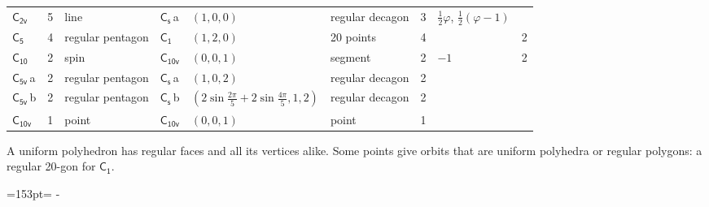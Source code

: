 \documentclass[10pt,a4paper]{article}
\newcommand{\needspace}[1]{\par\penalty-100\begingroup\dimen0=#1\relax\dimen2=\pagegoal
  \advance\dimen2-\pagetotal\ifdim\dimen0>\dimen2\relax\ifdim\dimen2>0pt\vfil\break\fi\fi
  \endgroup}
\numberwithin{equation}{section}
\newcommand{\grp}[1]{\mathsf{#1}}
\newcommand{\clsletter}[1]{\,{\scriptsize\color{black!55}#1}}
\newcommand{\goldenratio}{\varphi}
\newlength{\fillwidth}\newlength{\cellwidth}\newlength{\colwidth}
\begin{document}
{{\begin{longtable}{@{}lrllllr>{\RaggedRight\arraybackslash}p{\fillwidth}r@{}}
\href{C2v.pdf}{$\grp{C_{2v}}$} & 5 & line & \href{C1v.pdf}{$\grp{C_{s}}$}\clsletter{a} & $(1, 0, 0)$ & regular decagon & 3 & ${\tfrac{1}{2}\goldenratio{}}$, ${\tfrac{1}{2}(\goldenratio - 1)}$ & \\
\href{C5.pdf}{$\grp{C_{5}}$} & 4 & regular pentagon & \href{C1.pdf}{$\grp{C_{1}}$} & $(1, 2, 0)$ & 20 points & 4 &  & 2\\
\href{C10.pdf}{$\grp{C_{10}}$} & 2 & spin & \href{C10v.pdf}{$\grp{C_{10v}}$} & $(0, 0, 1)$ & segment & 2 & ${-1}$ & 2\\
\href{C5v.pdf}{$\grp{C_{5v}}$}\clsletter{a} & 2 & regular pentagon & \href{C1v.pdf}{$\grp{C_{s}}$}\clsletter{a} & $(1, 0, 2)$ & regular decagon & 2 &  & \\
\href{C5v.pdf}{$\grp{C_{5v}}$}\clsletter{b} & 2 & regular pentagon & \href{C1v.pdf}{$\grp{C_{s}}$}\clsletter{b} & $(2\sin\tfrac{2\pi}{5} + 2\sin\tfrac{4\pi}{5}, 1, 2)$ & regular decagon & 2 &  & \\*
\href{C10v.pdf}{$\grp{C_{10v}}$} & 1 & point & \href{C10v.pdf}{$\grp{C_{10v}}$} & $(0, 0, 1)$ & point & 1 &  & \\
\bottomrule\end{longtable}}}
A uniform polyhedron has regular faces and all its vertices alike. Some points give orbits that are uniform polyhedra or regular polygons: a regular 20-gon for \href{C1.pdf}{$\grp{C_{1}}$}.
\needspace{153pt}
\end{document}
